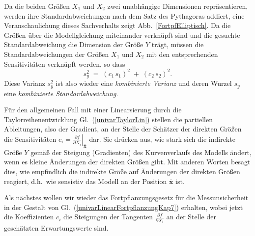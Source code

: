 Da die beiden Größen $X_1$ und $X_2$ zwei unabhängige Dimensionen repräsentieren, werden
ihre Standardabweichungen nach dem Satz des Pythagoras addiert, eine Veranschaulichung dieses
Sachverhalts zeigt Abb.~\ref{FortpfElliptisch}. Da die Größen über die Modellgleichung
miteinander verknüpft sind und die gesuchte Standardabweichung die Dimension der Größe $Y$
trägt, müssen die Standardabweichungen der Größen $X_1$ und $X_2$ mit den entsprechenden
Sensitivitäten verknüpft werden, so dass
\begin{equation}
s_y^2 \; = \; (c_1 \, s_1)^2 \; + \; (c_2 \, s_2)^2 .
\end{equation}
Diese Varianz $s_y^2$ ist also wieder eine \textsl{kombinierte Varianz} und deren Wurzel
$s_y$ eine \textsl{kombinierte Standardabweichung}.

Für den allgemeinen Fall mit einer Linearsierung durch die Taylorreihenentwicklung
Gl.~(\ref{univarTaylorLin}) stellen die partiellen Ableitungen, also der Gradient, an
der Stelle der Schätzer der direkten Größen die Sensitivitäten 
$c_i = \left. \frac{\partial f}{\partial X_i} \right|_{\bar{\mathbf{x}}}$ dar. Sie drücken aus,
wie stark sich die indirekte Größe $Y$ gemäß der Steigung (Gradienten) des Kurvenverlaufs des Modells 
ändert, wenn es kleine Änderungen der direkten Größen gibt. Mit anderen Worten besagt dies, wie
empfindlich die indirekte Größe auf Änderungen der direkten Größen reagiert, d.h.\ wie sensistiv
das Modell an der Position $\bar{\mathbf{x}}$ ist.

Als nächstes wollen wir wieder das Fortpflanzungsgesetz für die Messunsicherheit
in der Gestalt von Gl.~(\ref{univarLinearFortpflanzungKap7}) erhalten, wobei jetzt die Koeffizienten
$c_i$ die Steigungen der Tangenten $\frac{\partial f}{\partial X_i}$ an der Stelle
der geschätzten Erwartungswerte sind.

